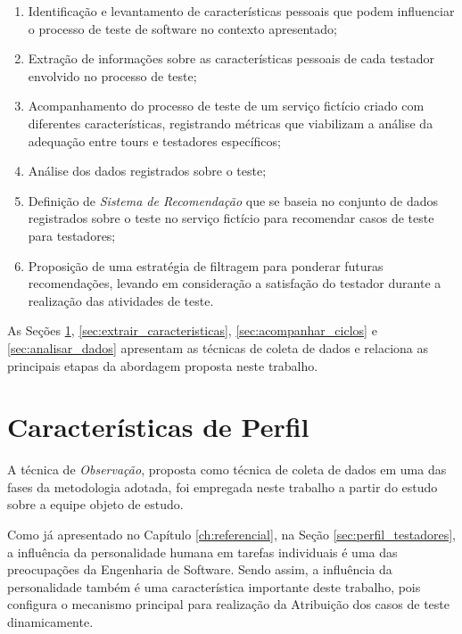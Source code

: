 \begin{enumerate}
    \item Identificação e levantamento de características pessoais que podem influenciar o processo de teste de software no contexto apresentado;

    \item Extração de informações sobre as características pessoais de cada testador envolvido no processo de teste;

    \item Acompanhamento do processo de teste de um serviço fictício criado com diferentes características, registrando métricas que viabilizam a análise da adequação entre tours e testadores específicos;


    \item Análise dos dados registrados sobre o teste;

    \item Definição de \textit{Sistema de Recomendação} que se baseia no conjunto de dados registrados sobre o teste no serviço fictício para recomendar casos de teste para testadores;

    \item Proposição de uma estratégia de filtragem para ponderar futuras recomendações, levando em consideração a satisfação do testador durante a realização das atividades de teste.
\end{enumerate}


As Seções \ref{sec:caracteristicas_importantes}, \ref{sec:extrair_caracteristicas}, \ref{sec:acompanhar_ciclos} e \ref{sec:analisar_dados} apresentam as técnicas de coleta de dados e relaciona as principais etapas da abordagem proposta neste trabalho.

\section{Características de Perfil}
\label{sec:caracteristicas_importantes}

A técnica de \textit{Observação}, proposta como técnica de coleta de dados em uma das fases da metodologia adotada, foi empregada neste trabalho a partir do estudo sobre a equipe objeto de estudo.

Como já apresentado no Capítulo \ref{ch:referencial}, na Seção \ref{sec:perfil_testadores}, a influência da personalidade humana em tarefas individuais é uma das preocupações da Engenharia de Software.  Sendo assim, a influência da personalidade também é uma característica importante deste trabalho, pois configura o mecanismo principal para realização da Atribuição dos casos de teste dinamicamente.

